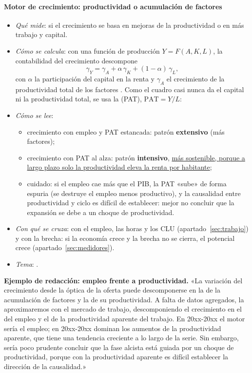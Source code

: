 \documentclass[11pt]{article}
\begin{document}
\paragraph{Motor de crecimiento: productividad o acumulación de factores}
\begin{itemize}
\item \emph{Qué mide}: si el crecimiento se basa en mejoras de la productividad o en más trabajo y capital.
\item \emph{Cómo se calcula}: con una función de producción $Y=F(A,K,L)$, la contabilidad del crecimiento descompone
\[
\gamma_Y=\gamma_A+\alpha\,\gamma_K+(1-\alpha)\,\gamma_L,
\]
con $\alpha$ la participación del capital en la renta y $\gamma_A$ el crecimiento de la productividad total de los factores . Como el cuadro casi nunca da el capital ni la productividad total, se usa la  (PAT), $\mathrm{PAT}=Y/L$:
\item \emph{Cómo se lee}:
  \begin{itemize}
  \item crecimiento con empleo y PAT estancada: patrón \textbf{extensivo} (más factores);
  \item crecimiento con PAT al alza: patrón \textbf{intensivo}, \uline{más sostenible, porque a largo plazo solo la productividad eleva la renta por habitante};
  \item cuidado: si el empleo cae más que el PIB, la PAT «sube» de forma espuria (se destruye el empleo menos productivo), y la causalidad entre productividad y ciclo es difícil de establecer: mejor no concluir que la expansión se debe a un choque de productividad.
  \end{itemize}
\item \emph{Con qué se cruza}: con el empleo, las horas y los CLU (apartado~\ref{sec:trabajo}) y con la brecha: si la economía crece y la brecha no se cierra, el potencial crece (apartado~\ref{sec:medidores}).
\item \emph{Tema}:   .
\end{itemize}

\begin{anotaciones}
\textbf{Ejemplo de redacción: empleo frente a productividad.}
«La variación del crecimiento desde la óptica de la oferta puede descomponerse en la de la acumulación de factores y la de su productividad. A falta de datos agregados, la aproximaremos con el mercado de trabajo, descomponiendo el crecimiento en el del empleo y el de la productividad aparente del trabajo. En 20xx-20xx el motor sería el empleo; en 20xx-20xx dominan los aumentos de la productividad aparente, que tiene una tendencia creciente a lo largo de la serie. Sin embargo, sería poco prudente concluir que la fase alcista está guiada por un choque de productividad, porque con la productividad aparente es difícil establecer la dirección de la causalidad.»
\end{anotaciones}
\end{document}
